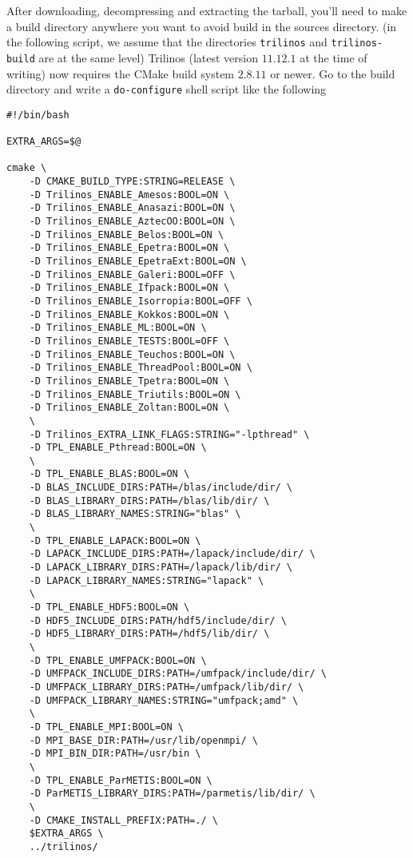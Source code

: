 After downloading, decompressing and extracting the tarball, you'll need to
make a build directory anywhere you want to avoid build in the sources directory. (in the
following script, we assume that the directories \verb!trilinos! and \verb!trilinos-build! are at the same level)
Trilinos (latest version $11.12.1$ at the time of writing) now requires the CMake
build system $2.8.11$ or newer.
Go to the build directory and write a \verb!do-configure! shell script like the following


\begin{lstlisting}
#!/bin/bash

EXTRA_ARGS=$@

cmake \
    -D CMAKE_BUILD_TYPE:STRING=RELEASE \
    -D Trilinos_ENABLE_Amesos:BOOL=ON \
    -D Trilinos_ENABLE_Anasazi:BOOL=ON \
    -D Trilinos_ENABLE_AztecOO:BOOL=ON \
    -D Trilinos_ENABLE_Belos:BOOL=ON \
    -D Trilinos_ENABLE_Epetra:BOOL=ON \
    -D Trilinos_ENABLE_EpetraExt:BOOL=ON \
    -D Trilinos_ENABLE_Galeri:BOOL=OFF \
    -D Trilinos_ENABLE_Ifpack:BOOL=ON \
    -D Trilinos_ENABLE_Isorropia:BOOL=OFF \
    -D Trilinos_ENABLE_Kokkos:BOOL=ON \
    -D Trilinos_ENABLE_ML:BOOL=ON \
    -D Trilinos_ENABLE_TESTS:BOOL=OFF \
    -D Trilinos_ENABLE_Teuchos:BOOL=ON \
    -D Trilinos_ENABLE_ThreadPool:BOOL=ON \
    -D Trilinos_ENABLE_Tpetra:BOOL=ON \
    -D Trilinos_ENABLE_Triutils:BOOL=ON \
    -D Trilinos_ENABLE_Zoltan:BOOL=ON \
    \
    -D Trilinos_EXTRA_LINK_FLAGS:STRING="-lpthread" \
    -D TPL_ENABLE_Pthread:BOOL=ON \
    \
    -D TPL_ENABLE_BLAS:BOOL=ON \
    -D BLAS_INCLUDE_DIRS:PATH=/blas/include/dir/ \
    -D BLAS_LIBRARY_DIRS:PATH=/blas/lib/dir/ \
    -D BLAS_LIBRARY_NAMES:STRING="blas" \
    \
    -D TPL_ENABLE_LAPACK:BOOL=ON \
    -D LAPACK_INCLUDE_DIRS:PATH=/lapack/include/dir/ \
    -D LAPACK_LIBRARY_DIRS:PATH=/lapack/lib/dir/ \
    -D LAPACK_LIBRARY_NAMES:STRING="lapack" \
    \
    -D TPL_ENABLE_HDF5:BOOL=ON \
    -D HDF5_INCLUDE_DIRS:PATH/hdf5/include/dir/ \
    -D HDF5_LIBRARY_DIRS:PATH=/hdf5/lib/dir/ \
    \
    -D TPL_ENABLE_UMFPACK:BOOL=ON \
    -D UMFPACK_INCLUDE_DIRS:PATH=/umfpack/include/dir/ \
    -D UMFPACK_LIBRARY_DIRS:PATH=/umfpack/lib/dir/ \
    -D UMFPACK_LIBRARY_NAMES:STRING="umfpack;amd" \
    \
    -D TPL_ENABLE_MPI:BOOL=ON \
    -D MPI_BASE_DIR:PATH=/usr/lib/openmpi/ \
    -D MPI_BIN_DIR:PATH=/usr/bin \
    \
    -D TPL_ENABLE_ParMETIS:BOOL=ON \
    -D ParMETIS_LIBRARY_DIRS:PATH=/parmetis/lib/dir/ \
    \
    -D CMAKE_INSTALL_PREFIX:PATH=./ \
    $EXTRA_ARGS \
    ../trilinos/
\end{lstlisting}

